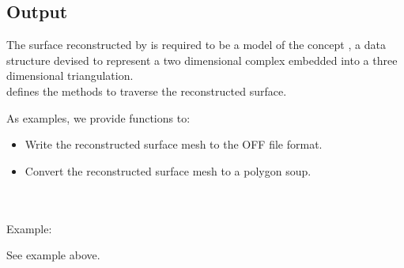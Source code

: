 \subsection{Output}

The surface reconstructed by  is required to be a model of the concept , a data structure devised to represent a two dimensional complex embedded into a three dimensional triangulation.\\

 defines the methods to traverse the reconstructed surface.

As examples, we provide functions to:

\begin{itemize}
\item Write the reconstructed surface mesh to the
      OFF file format.
\item Convert the reconstructed surface mesh to a
      polygon soup.
\end{itemize}

  \\
  \\

Example:

See  example above.
